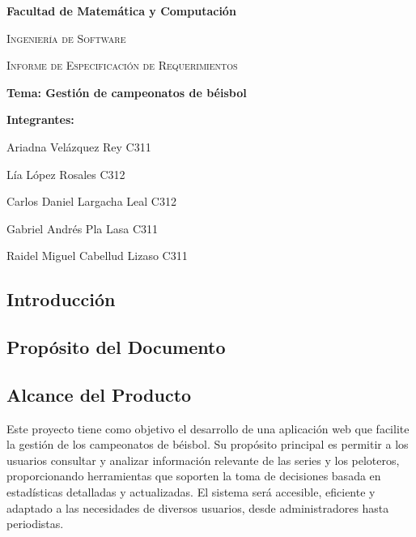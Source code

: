 \documentclass{report}
\begin{document}
    \begin{titlepage}
        \centering
        {\bfseries\LARGE Facultad de Matemática y Computación \par}
        \vspace*{1cm}
        {\scshape\Large Ingeniería de Software \par}
        \vspace*{3cm}
        {\scshape\Huge Informe de Especificación de Requerimientos \par}
        \vspace*{1cm}
        {\LARGE \textbf{Tema: Gestión de campeonatos de béisbol} }
        \vfill
        {\bfseries\LARGE Integrantes: \par}
        {\Large Ariadna Vel\'azquez Rey  C311 \par} 
        {\Large L\'ia L\'opez Rosales  C312 \par} 
        {\Large Carlos Daniel Largacha Leal  C312 \par} 
        {\Large Gabriel Andr\'es Pla Lasa  C311 \par} 
        {\Large Raidel Miguel Cabellud Lizaso C311 \par} 
        \vfill
    \end{titlepage}

    \begin{center}
        \section*{Introducción}
    \end{center}

        \subsection*{Propósito del Documento}

        \subsection*{Alcance del Producto}

        Este proyecto tiene como objetivo el desarrollo de una aplicación web que facilite la gestión de los 
        campeonatos de béisbol. Su propósito principal es permitir a los usuarios consultar y analizar información 
        relevante de las series y los peloteros, proporcionando herramientas que soporten la toma de decisiones 
        basada en estadísticas detalladas y actualizadas. El sistema será accesible, eficiente y adaptado a las 
        necesidades de diversos usuarios, desde administradores hasta periodistas.
\end{document}
